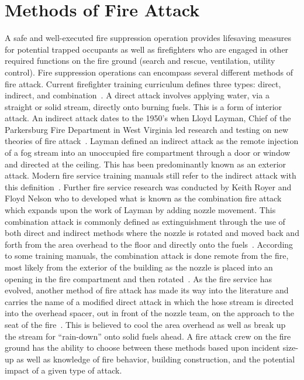 \documentclass[12pt,oneside]{book}
\begin{document}
\section*{Methods of Fire Attack}

A safe and well-executed fire suppression operation provides lifesaving measures for potential trapped occupants as well as firefighters who are engaged in other required functions on the fire ground (search and rescue, ventilation, utility control). Fire suppression operations can encompass several different methods of fire attack. Current firefighter training curriculum defines three types: direct, indirect, and combination~\cite{Essentials6}. A direct attack involves applying water, via a straight or solid stream, directly onto burning fuels. This is a form of interior attack. An indirect attack dates to the 1950's when Lloyd Layman, Chief of the Parkersburg Fire Department in West Virginia led research and testing on new theories of fire attack~\cite{ExtinguishingFires, FirefightingTactics}. Layman defined an indirect attack as the remote injection of a fog stream into an unoccupied fire compartment through a door or window and directed at the ceiling. This has been predominantly known as an exterior attack. Modern fire service training manuals still refer to the indirect attack with this definition~\cite{Essentials6,FEHandbook}. Further fire service research was conducted by Keith Royer and Floyd Nelson who to developed what is known as the combination fire attack which expands upon the work of Layman by adding nozzle movement. This combination attack is commonly defined as extinguishment through the use of both direct and indirect methods where the nozzle is rotated and moved back and forth from the area overhead to the floor and directly onto the fuels~\cite{Essentials6}. According to some training manuals, the combination attack is done remote from the fire, most likely from the exterior of the building as the nozzle is placed into an opening in the fire compartment and then rotated~\cite{FEHandbook}. As the fire service has evolved, another method of fire attack has made its way into the literature and carries the name of a modified direct attack in which the hose stream is directed into the overhead spacer, out in front of the nozzle team, on the approach to the seat of the fire~\cite{FEHandbook}. This is believed to cool the area overhead as well as break up the stream for ``rain-down'' onto solid fuels ahead. A fire attack crew on the fire ground has the ability to choose between these methods based upon incident size-up as well as knowledge of fire behavior, building construction, and the potential impact of a given type of attack.
\end{document}
